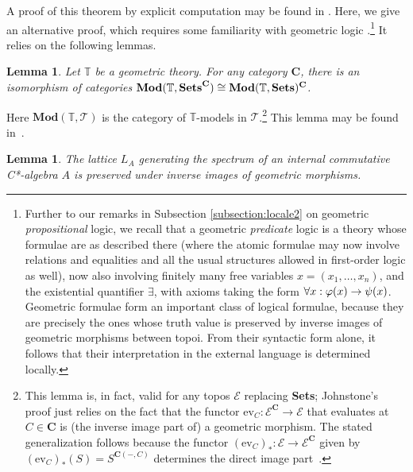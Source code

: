 \documentclass[12pt]{article}
\newcommand{\Sets}{\mbox{\textbf{Sets}}}
\newcommand{\raw}{\rightarrow} \newcommand{\rat}{\mapsto}
\newcommand{\CT}{{\mathcal T}} \newcommand{\CV}{{\mathcal V}}
\newcommand{\cat}[1]{\ensuremath{\mathbf{#1}}}
\newcommand{\Cat}[1]{\ensuremath{\mathrm{\textbf{#1}}}}
\newtheorem{lemma}[theorem]{Lemma}
\begin{document}
A proof of this theorem by explicit computation may be found in \cite[Thm.\ 5.2.3]{caspers}. Here, we give an alternative proof, which
requires some familiarity with geometric logic
\cite{maclanemoerdijk92,johnstone02b,Vic:LocTopSp}.\footnote{Further to our
remarks in Subsection \ref{subsection:locale2}
on geometric {\it propositional} logic, we recall that a geometric
{\it predicate} logic is a theory whose formulae are as described there (where the atomic
formulae may now involve relations and equalities and all the usual structures
allowed in first-order logic as well),
 now also involving finitely many free variables $x=(x_1,\ldots, x_n)$, and the existential quantifier $\exists$, 
with
axioms taking the form $\forall x: \phv(x)\raw\ps(x)$. 
Geometric formulae form
an important class of logical formulae, because they are precisely the ones
whose truth value is preserved by inverse images of geometric morphisms
between topoi. From their syntactic form alone, it follows that their
interpretation
in the external language is determined locally.} It
 relies on the following lemmas.
\begin{lemma}
\label{prop:geometricformulae}
  Let  $\mathbb{T}$ be a geometric theory. For 
  any category   $\cat{C}$, there is an
  isomorphism of categories $\Cat{Mod}(\mathbb{T},\Sets^{\cat{C}}) \cong
  \Cat{Mod}(\mathbb{T},\Sets)^{\cat{C}}$.
\end{lemma}
  Here $\Cat{Mod}(\mathbb{T},\CT)$ is the category of
  $\mathbb{T}$-models in $\CT$.\footnote{This lemma is, in fact, valid for any topos $\mathcal{E}$ replacing \Sets; Johnstone's proof just relies on the
fact that the functor
  $\mathrm{ev}_C : \mathcal{E}^{\cat{C}} \to \mathcal{E}$ that evaluates at
  $C \in \cat{C}$ is (the inverse image part of) a geometric
  morphism. The stated generalization follows because the
  functor $(\mathrm{ev}_C)_* : \mathcal{E} \to \mathcal{E}^{\cat{C}}$ given by
  $(\mathrm{ev}_C)_*(S) = S^{\cat{C}(-,C)}$ determines the direct
  image part~\cite[Exercise~VII.10.1]{maclanemoerdijk92}.}
  This lemma may be found in~\cite[Corollary
  D.1.2.14]{johnstone02b}.
\begin{lemma}\label{invlemma}
The  lattice $L_A$  generating the
spectrum of an internal commutative C*-algebra $A$ is preserved under inverse
images of geometric
morphisms.
 \end{lemma}
\end{document}

